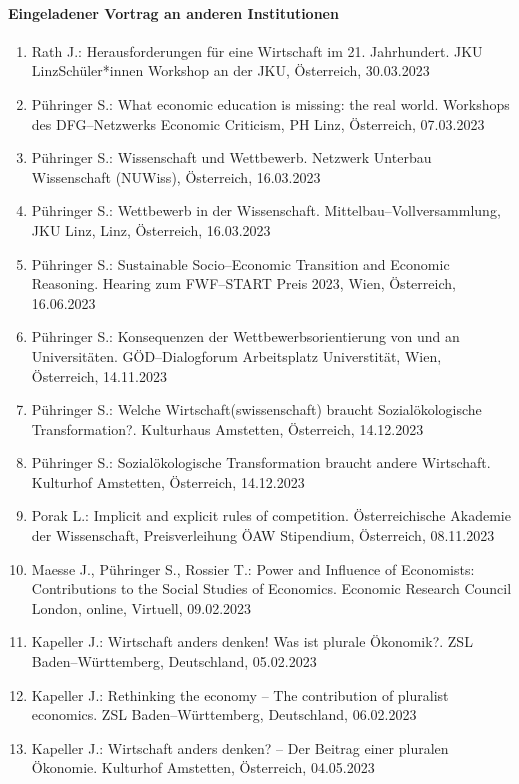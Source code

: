 \paragraph{Eingeladener Vortrag an anderen Institutionen}
\begin{enumerate}
	\item Rath J.: Herausforderungen für eine Wirtschaft im 21. Jahrhundert. JKU LinzSchüler*innen Workshop an der JKU, Österreich, 30.03.2023
	\item Pühringer S.: What economic education is missing: the real world. Workshops des DFG--Netzwerks Economic Criticism, PH Linz, Österreich, 07.03.2023
	\item Pühringer S.: Wissenschaft und Wettbewerb. Netzwerk Unterbau Wissenschaft (NUWiss), Österreich, 16.03.2023
	\item Pühringer S.: Wettbewerb in der Wissenschaft. Mittelbau--Vollversammlung, JKU Linz, Linz, Österreich, 16.03.2023
	\item Pühringer S.: Sustainable Socio--Economic Transition and Economic Reasoning. Hearing zum FWF--START Preis 2023, Wien, Österreich, 16.06.2023
	\item Pühringer S.: Konsequenzen der Wettbewerbsorientierung von und an Universitäten. GÖD--Dialogforum Arbeitsplatz Universtität, Wien, Österreich, 14.11.2023
	\item Pühringer S.: Welche Wirtschaft(swissenschaft) braucht Sozialökologische Transformation?. Kulturhaus Amstetten, Österreich, 14.12.2023
	\item Pühringer S.: Sozialökologische Transformation braucht andere Wirtschaft. Kulturhof Amstetten, Österreich, 14.12.2023
	\item Porak L.: Implicit and explicit rules of competition. Österreichische Akademie der Wissenschaft, Preisverleihung ÖAW Stipendium, Österreich, 08.11.2023
	\item Maesse J., Pühringer S., Rossier T.: Power and Influence of Economists: Contributions to the Social Studies of Economics. Economic Research Council London, online, Virtuell, 09.02.2023
	\item Kapeller J.: Wirtschaft anders denken! Was ist plurale Ökonomik?. ZSL Baden--Württemberg, Deutschland, 05.02.2023
	\item Kapeller J.: Rethinking the economy – The contribution of pluralist economics. ZSL Baden--Württemberg, Deutschland, 06.02.2023
	\item Kapeller J.: Wirtschaft anders denken? – Der Beitrag einer pluralen Ökonomie. Kulturhof Amstetten, Österreich, 04.05.2023

\end{enumerate}
